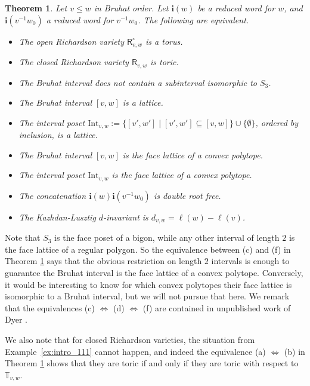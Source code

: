 \documentclass[a4paper, 11pt]{amsart}
\newcommand{\orich}[1]{\mathsf{R}^{\circ}_{#1}}
\newcommand{\rich}[1]{\mathsf{R}_{#1}}
\newcommand{\word}[1]{\mathbf{#1}}
\newcommand{\dil}[1]{\mathbb{T}_{#1}}
\newtheorem{theorem}{Theorem}[section]
\theoremstyle{definition}
\begin{document}
\begin{theorem}\label{thm:toric-richardson-intro}
Let $v \leq w$ in Bruhat order. Let $\word{i}(w)$ be a reduced word for $w$, and $\word{i}(v^{-1}w_0)$ a reduced word for $v^{-1}w_0$. The following are equivalent.
\begin{itemize}
    \item[(a)] The open Richardson variety $\orich{v,w}$ is a torus.
    \item[(b)] The closed Richardson variety $\rich{v,w}$ is toric.
    \item[(c)] The Bruhat interval does not contain a subinterval isomorphic to $S_3$.
    \item[(d)] The Bruhat interval $[v,w]$ is a lattice.
    \item[(e)] The interval poset $\mathrm{Int}_{v,w} := \{[v',w'] \mid [v', w'] \subseteq [v,w]\}\cup\{\emptyset\}$, ordered by inclusion, is a lattice.
    \item[(f)] The Bruhat interval $[v,w]$ is the face lattice of a convex polytope.
    \item[(g)] The interval poset $\mathrm{Int}_{v,w}$ is the face lattice of a convex polytope.
    \item[(h)]  The concatenation $\word{i}(w)\word{i}(v^{-1}w_0)$ is double root free. 
    \item[(i)] The Kazhdan-Lusztig $d$-invariant is $d_{v,w} = \ell(w) - \ell(v)$.
\end{itemize}
\end{theorem}

Note that $S_3$ is the face poset of a bigon, while any other interval of length $2$ is the face lattice of a regular polygon. So the equivalence between (c) and (f) in Theorem \ref{thm:toric-richardson-intro} says that the obvious restriction on length $2$ intervals is enough to guarantee the Bruhat interval is the face lattice of a convex polytope. Conversely, it would be interesting to know for which convex polytopes their face lattice is isomorphic to a Bruhat interval, but we will not pursue that here. We remark that the equivalences (c) $\Longleftrightarrow$ (d) $\Longleftrightarrow$ (f) are contained in unpublished work of Dyer \cite{Dyer_unpublished}. 

We also note that for closed Richardson varieties, the situation from Example~\ref{ex:intro_111} cannot happen, and indeed the equivalence (a) $\Longleftrightarrow$ (b) in Theorem \ref{thm:toric-richardson-intro} shows that they are toric if and only if they are toric with respect to $\dil{v,w}$.
\end{document}
